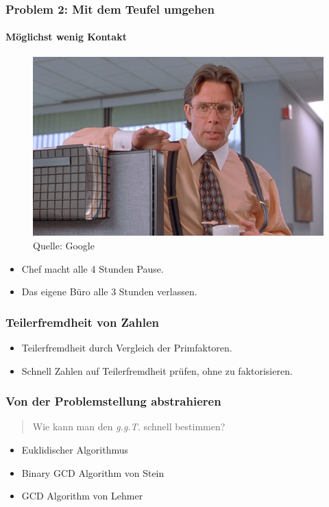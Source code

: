 \documentclass[•]{beamer}
\begin{document}
\begin{frame}
	\frametitle{Problem 2: Mit dem Teufel umgehen}
    \framesubtitle{M\"oglichst wenig Kontakt}
    \vspace*{10pt}
     \begin{figure}
	\centering
	\includegraphics[scale=0.17]{cicada}
	\caption*{\scriptsize{Quelle: Google}}
	\end{figure}
    \begin{itemize}
    \item Chef macht alle 4 Stunden Pause.
    \item Das eigene B\"uro alle 3 Stunden verlassen.
    \end{itemize}
\end{frame}

\begin{frame}
	\frametitle{Teilerfremdheit von Zahlen}
\begin{itemize}
\item Teilerfremdheit durch Vergleich der Primfaktoren.
\item Schnell Zahlen auf Teilerfremdheit pr\"ufen, ohne zu faktorisieren.
\end{itemize}
\end{frame}

\begin{frame}
\frametitle{Von der Problemstellung abstrahieren}
\begin{quote}
		Wie kann man den \textit{g.g.T.} schnell bestimmen?
	\end{quote}
	\begin{itemize}
	\item Euklidischer Algorithmus
	\item Binary GCD Algorithm von Stein
	\item GCD Algorithm von Lehmer
	\end{itemize}
\end{frame}
\end{document}
